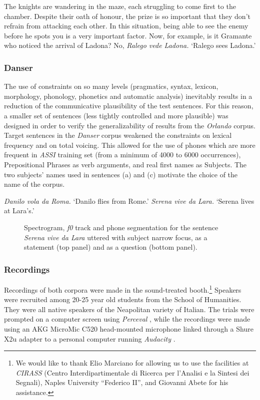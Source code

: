 \clearpage
\eal
\ex The knights are wandering in the maze, each struggling to come first to the chamber. Despite their oath of honour, the prize is so important that they don't refrain from attacking each other. In this situation, being able to see the enemy before he spots you is a very important factor. Now, for example, is it Gramante who noticed the arrival of Ladona?  
\ex No, \textit{Ralego vede Ladona.}
\ex `Ralego sees Ladona.'
\zl

\subsubsection{Danser}\label{sec4212}
The use of constraints on so many levels (pragmatics, syntax, lexicon, morphology, phonology, phonetics and automatic analysis) inevitably results in a reduction of the communicative plausibility of the test sentences. For this reason, a smaller set of sentences (less tightly controlled and more plausible) was designed in order to verify the generalizability of results from the \textit{Orlando} corpus. Target sentences in the \textit{Danser} corpus weakened the constraints on lexical frequency and on total voicing. This allowed for the use of phones which are more frequent in \textit{ASSI} training set (from a minimum of 4000 to 6000 occurrences), Prepositional Phrases as verb arguments, and real first names as Subjects. The two subjects' names used in sentences (a) and (c) motivate the choice of the name of the corpus.

\eal
\ex \textit{Danilo vola da Roma.}
\ex `Danilo flies from Rome.'
\ex \textit{Serena vive da Lara.}
\ex `Serena lives at Lara's.'
\zl

\begin{figure}
\centering
{}
\caption{Spectrogram, \textit{f0} track and phone segmentation for the sentence \textit{Serena vive da Lara} uttered with subject narrow focus, as a statement (top panel) and as a question (bottom panel).}
\label{fig401}\end{figure}

\subsubsection{Recordings}\label{sec4213}
Recordings of both corpora were made in the sound-treated booth.\footnote{We would like to thank Elio Marciano for allowing us to use the facilities at \textit{CIRASS} (Centro Interdipartimentale di Ricerca per l'Analisi e la Sintesi dei Segnali), Naples University ``Federico II'', and Giovanni Abete for his assistance.} Speakers were recruited among 20-25 year old students from the School of Humanities. They were all native speakers of the Neapolitan variety of Italian. The trials were prompted on a computer screen using \textit{Perceval} \citep{andre2003perceval}, while the recordings were made using an AKG MicroMic C520 head-mounted microphone linked through a Shure X2u adapter to a personal computer running \textit{Audacity} \citep{audacity2006audacity}. 

